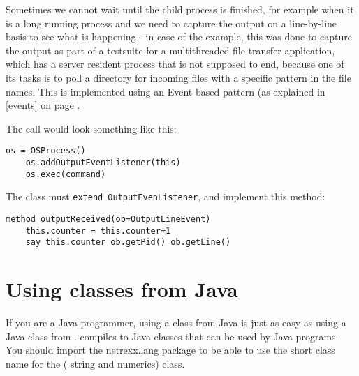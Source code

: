 Sometimes we cannot wait until the child process is finished, for
example when it is a long running process and we need to capture the
output on a line-by-line basis to see what is happening - in case of
the example, this was done to capture the output as part of a
testsuite for a multithreaded file transfer application, which has a
server resident process that is not supposed to end, because one of
its tasks is to poll a directory for incoming files with a specific
pattern in the file names. This is implemented using an Event based
pattern (as explained in \ref{events}  on page \pageref{events}. 
 

 

The call would look something like this:
\begin{lstlisting}[label=callosprocessexample,caption=Example of calling the OSProcess class - registering an eventhandler]
    os = OSProcess()
    os.addOutputEventListener(this)
    os.exec(command)
\end{lstlisting}

The class must \texttt{extend OutputEvenListener}, and implement this
method:

\begin{lstlisting}[label=registerhandlerexample,caption=Example of implementing the listener method]
  method outputReceived(ob=OutputLineEvent)
    this.counter = this.counter+1
    say this.counter ob.getPid() ob.getLine()
\end{lstlisting}

\chapter{Using \nr{} classes from Java}
If you are a Java programmer, using a \nr{} class from Java is just as
easy as using a Java class from \nr{}. \nr{} compiles to Java classes that can be used by Java programs.
You should import the netrexx.lang package to be able to use the short
class name for the \Rexx{} (\nr{} string and numerics) class.

